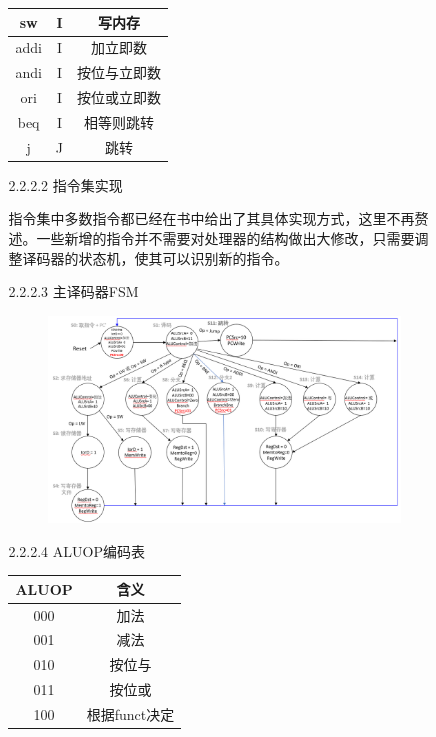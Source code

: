\documentclass[UTF8]{article}
\begin{document}
\begin{enumerate}
\begin{enumerate}
\begin{enumerate}
\begin{tabular}{|c|c|c|}
								sw   & I       & 写内存       \\ \hline 
								addi & I       & 加立即数     \\ \hline 
								andi & I       & 按位与立即数 \\ \hline 
								ori  & I       & 按位或立即数 \\ \hline 
								beq  & I       & 相等则跳转   \\ \hline 
								j    & J       & 跳转        \\ \hline 
							\end{tabular}
						\item [2.2.2.2] 指令集实现
							\par 指令集中多数指令都已经在书中给出了其具体实现方式，这里不再赘述。一些新增的指令并不需要对处理器的结构做出大修改，只需要调整译码器的状态机，使其可以识别新的指令。
						\item [2.2.2.3] 主译码器FSM\\
							\begin{figure}[htbp]
								\centering
								\includegraphics[scale=0.3]{2-2-2-3.png}
							\end{figure}
						\item [2.2.2.4] ALUOP编码表\\
							\begin{tabular}{|c|c|} \hline
								ALUOP & 含义          \\ \hline 
								000   & 加法          \\ \hline 
								001   & 减法          \\ \hline 
								010   & 按位与        \\ \hline 
								011   & 按位或        \\ \hline 
								100   & 根据funct决定 \\ \hline 

\end{tabular}
\end{enumerate}
\end{enumerate}
\end{enumerate}
\end{document}
